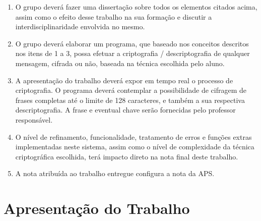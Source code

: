 \documentclass[12pt]{article}
\begin{document}
\begin{enumerate}
\item O grupo deverá fazer uma dissertação sobre todos os elementos citados
acima, assim como o efeito desse trabalho na sua formação e discutir a
interdisciplinaridade envolvida no mesmo.
\item O grupo deverá elaborar um programa, que baseado nos conceitos descritos
nos itens de 1 a 3, possa efetuar a criptografia / descriptografia de qualquer
mensagem, cifrada ou não, baseada na técnica escolhida pelo aluno.
\item A apresentação do trabalho deverá expor em tempo real o processo de
criptografia. O programa deverá contemplar a possibilidade de cifragem de
frases completas até o limite de 128 caracteres, e também a sua respectiva
descriptografia. A frase e eventual chave serão fornecidas pelo professor
responsável.
\item O nível de refinamento, funcionalidade, tratamento de erros e funções extras
implementadas neste sistema, assim como o nível de complexidade da
técnica criptográfica escolhida, terá impacto direto na nota final deste
trabalho.
\item A nota atribuída ao trabalho entregue configura a nota da APS.

\end{enumerate}


\section{Apresentação do Trabalho}
\end{document}
